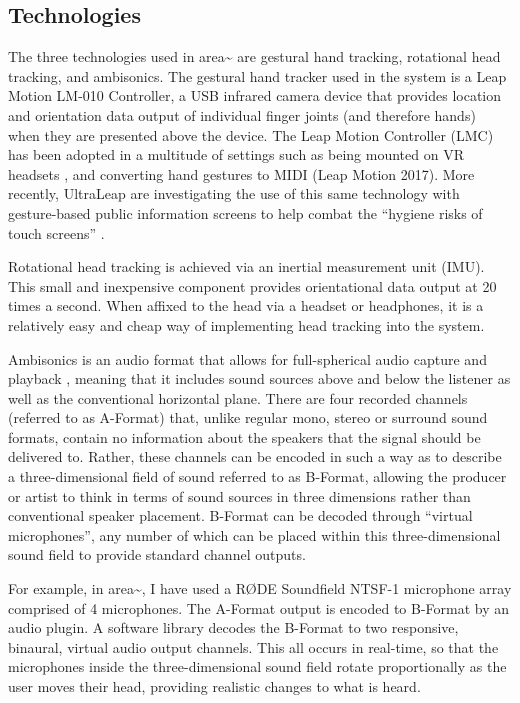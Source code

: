\subsection{Technologies}                       \label{sec: area-intro-tech}
The three technologies used in area\textasciitilde{} are gestural hand tracking, rotational head tracking, and ambisonics. The gestural hand tracker used in the system is a Leap Motion LM-010 Controller, a USB infrared camera device that provides location and orientation data output of individual finger joints (and therefore hands) when they are presented above the device. The Leap Motion Controller (LMC) has been adopted in a multitude of settings such as being mounted on VR headsets \citep{leapmotion2016}, and converting hand gestures to MIDI (Leap Motion 2017). More recently, UltraLeap are investigating the use of this same technology with gesture-based public information screens to help combat the “hygiene risks of touch screens” \citeyearpar{ultraleap2020a}.

Rotational head tracking is achieved via an inertial measurement unit (IMU). This small and inexpensive component provides orientational data output at 20 times a second. When affixed to the head via a headset or headphones, it is a relatively easy and cheap way of implementing head tracking into the system.

Ambisonics is an audio format that allows for full-spherical audio capture and playback \citep{gerzon1973}, meaning that it includes sound sources above and below the listener as well as the conventional horizontal plane. There are four recorded channels (referred to as A-Format) that, unlike regular mono, stereo or surround sound formats, contain no information about the speakers that the signal should be delivered to. Rather, these channels can be encoded in such a way as to describe a three-dimensional field of sound referred to as B-Format, allowing the producer or artist to think in terms of sound sources in three dimensions rather than conventional speaker placement. B-Format can be decoded through “virtual microphones”, any number of which can be placed within this three-dimensional sound field to provide standard channel outputs.

For example, in area\textasciitilde{}, I have used a RØDE Soundfield NTSF-1 microphone array comprised of 4 microphones. The A-Format output is encoded to B-Format by an audio plugin. A software library decodes the B-Format to two responsive, binaural, virtual audio output channels. This all occurs in real-time, so that the microphones inside the three-dimensional sound field rotate proportionally as the user moves their head, providing realistic changes to what is heard.


